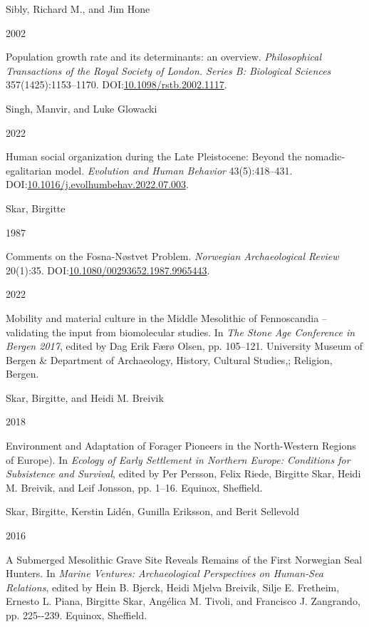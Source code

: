 \documentclass[
  12pt,
  a4paper,
  oneside]{book}
\newlength{\cslhangindent}
\newlength{\csllabelwidth}
\newlength{\cslentryspacingunit} %
\newenvironment{CSLReferences}[2] %
 {%
  \setlength{\parindent}{0pt}
  \ifodd #1
  \let\oldpar\par
  \def\par{\hangindent=\cslhangindent\oldpar}
  \fi
  \setlength{\parskip}{#2\cslentryspacingunit}
 }%
 {}
\newcommand{\CSLBlock}[1]{#1\hfill\break}
\newcommand{\CSLLeftMargin}[1]{\parbox[t]{\csllabelwidth}{#1}}
\newcommand{\CSLRightInline}[1]{\parbox[t]{\linewidth - \csllabelwidth}{#1}\break}
\begin{document}
\begin{CSLReferences}{0}{0}
\leavevmode{}%
\CSLBlock{Sibly, Richard M., and Jim Hone}
\CSLLeftMargin{ 2002}
\CSLRightInline{Population growth rate and its determinants: an overview. \emph{Philosophical Transactions of the Royal Society of London. Series B: Biological Sciences} 357(1425):1153--1170. DOI:\href{https://doi.org/10.1098/rstb.2002.1117}{10.1098/rstb.2002.1117}.}

\leavevmode{}%
\CSLBlock{Singh, Manvir, and Luke Glowacki}
\CSLLeftMargin{ 2022}
\CSLRightInline{{Human social organization during the Late Pleistocene: Beyond the nomadic-egalitarian model}. \emph{Evolution and Human Behavior} 43(5):418--431. DOI:\href{https://doi.org/10.1016/j.evolhumbehav.2022.07.003}{10.1016/j.evolhumbehav.2022.07.003}.}

\leavevmode{}%
\CSLBlock{Skar, Birgitte}
\CSLLeftMargin{ 1987}
\CSLRightInline{{Comments on the Fosna-Nøstvet Problem}. \emph{Norwegian Archaeological Review} 20(1):35. DOI:\href{https://doi.org/10.1080/00293652.1987.9965443}{10.1080/00293652.1987.9965443}.}

\leavevmode{}%
\CSLLeftMargin{ 2022 }
\CSLRightInline{{Mobility and material culture in the Middle Mesolithic of Fennoscandia -- validating the input from biomolecular studies}. In \emph{{The Stone Age Conference in Bergen 2017}}, edited by Dag Erik Færø Olsen, pp. 105--121. University Museum of Bergen \& Department of Archaeology, History, Cultural Studies,; Religion, Bergen.}

\leavevmode{}%
\CSLBlock{Skar, Birgitte, and Heidi M. Breivik}
\CSLLeftMargin{ 2018}
\CSLRightInline{{Environment and Adaptation of Forager Pioneers in the North-Western Regions of Europe)}. In \emph{{Ecology of Early Settlement in Northern Europe: Conditions for Subsistence and Survival}}, edited by Per Persson, Felix Riede, Birgitte Skar, Heidi M. Breivik, and Leif Jonsson, pp. 1--16. Equinox, Sheffield.}

\leavevmode{}%
\CSLBlock{Skar, Birgitte, Kerstin Lidén, Gunilla Eriksson, and Berit Sellevold}
\CSLLeftMargin{ 2016}
\CSLRightInline{{A Submerged Mesolithic Grave Site Reveals Remains of the First Norwegian Seal Hunters}. In \emph{{Marine Ventures: Archaeological Perspectives on Human-Sea Relations}}, edited by Hein B. Bjerck, Heidi Mjelva Breivik, Silje E. Fretheim, Ernesto L. Piana, Birgitte Skar, Angélica M. Tivoli, and Francisco J. Zangrando, pp. 225-\/-239. Equinox, Sheffield.}


\end{CSLReferences}
\end{document}
